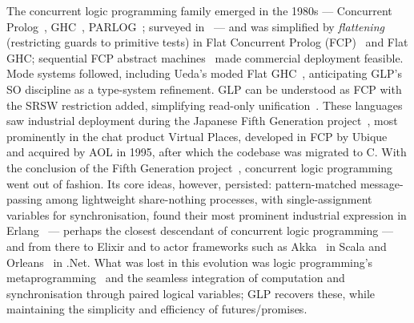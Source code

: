  The concurrent logic programming family emerged in the 1980s --- Concurrent Prolog~\cite{shapiro1983subset}, GHC~\cite{ueda1986guarded}, PARLOG~\cite{clark1986parlog}; surveyed in~\cite{shapiro1989family} --- and was simplified by \emph{flattening} (restricting guards to primitive tests) in Flat Concurrent Prolog (FCP)~\cite{mierowsky1985fcp} and Flat GHC; sequential FCP abstract machines~\cite{houri1989sequential} made commercial deployment feasible. Mode systems followed, including Ueda's moded Flat GHC~\cite{ueda1994moded,ueda1995io,ueda2001resource}, anticipating GLP's SO discipline as a type-system refinement. GLP can be understood as FCP with the SRSW restriction added, simplifying read-only unification~\cite{levi1985readonly}. These languages saw industrial deployment during the Japanese Fifth Generation project~\cite{moto1983overview,shapiro1983fifth}, most prominently in the chat product Virtual Places, developed in FCP by Ubique~\cite{Ubique} and acquired by AOL in 1995, after which the codebase was migrated to C. With the conclusion of the Fifth Generation project~\cite{shapiro19935th}, concurrent logic programming went out of fashion. Its core ideas, however, persisted: pattern-matched message-passing among lightweight share-nothing processes, with single-assignment variables for synchronisation, found their most prominent industrial expression in Erlang~\cite{armstrong2010erlang} --- perhaps the closest descendant of concurrent logic programming --- and from there to Elixir and to actor frameworks such as Akka~\cite{akka2022} in Scala and Orleans~\cite{orleans2022} in .Net. What was lost in this evolution was logic programming's metaprogramming~\cite{safra1988meta,lichtenstein1988concurrent} and the seamless integration of computation and synchronisation through paired logical variables; GLP recovers these, while maintaining the simplicity and efficiency of futures/promises.

